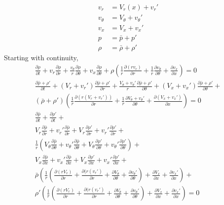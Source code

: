 \begin{align}
v_r 		&= V_r(x) + v_r'\\
v_{\theta} 	&= V_{\theta} + v_{\theta}'\\
v_x 		&= V_x + v_x'\\
p 			&= \bar{p} + p'\\
\rho 		&= \bar{\rho} + \rho'
\end{align}
\newpage
Starting with continuity,
\begin{equation*} 
\end{equation*}
\begin{align*}
\frac{\partial \rho}{\partial t} + 
v_r \frac{\partial \rho}{\partial r} +
\frac{v_{\theta}   }{r}
\frac{\partial \rho}{\partial \theta} +
v_x \frac{\partial \rho}{\partial \theta} + 
\rho 
\left(
\frac{1}{r} \frac{\partial (rv_r)	}{\partial r} +
\frac{1}{r}	\frac{\partial v_{\theta}}{\partial \theta} +
\frac{\partial v_x}{\partial x}
\right) 
= 0\\
\frac{\partial \bar{\rho} + \rho' }{\partial t} +
(V_r + v_r') 
\frac{\partial \bar{\rho} + \rho'}{\partial r} +
\frac{V_{\theta} + v_{\theta}'}{r}
\frac{\partial \bar{\rho} + \rho'}{\partial \theta} +
(V_x + v_x') 
\frac{\partial \bar{\rho} + \rho'}{\partial \theta} + \\ 
(\bar{\rho} + \rho') 
\left(
\frac{1}{r}\frac{\partial (r(V_r +v_r'))}{\partial r} +
\frac{1}{r}\frac{\partial V_{\theta}+v_{\theta}'}{\partial \theta} +
\frac{\partial (V_x + v_x')}{\partial x}
\right) = 0\\
\frac{\partial \bar{\rho}}{\partial t} + 
\frac{\partial \rho'     }{\partial t} +\\
V_r \frac{\partial \bar{\rho}}{\partial r} +  
v_r'\frac{\partial \bar{\rho}}{\partial r} + 
V_r \frac{\partial \rho'}{\partial r} +
v_r'\frac{\partial \rho'}{\partial r} + \\
\frac{1}{r}
\left(
V_{\theta} \frac{\partial \bar{\rho}}{\partial \theta} +
v_{\theta}'\frac{\partial \bar{\rho}}{\partial \theta} + 
V_{\theta} \frac{\partial \rho'		}{\partial \theta} + 
v_{\theta}'\frac{\partial \rho'		}{\partial \theta}
\right) + \\ 
V_x \frac{\partial \bar{\rho}}{\partial x} + 
v_x'\frac{\partial \bar{\rho}}{\partial x} +
V_x \frac{\partial \rho'	 }{\partial x} 	+
v_x'\frac{\partial \rho'    }{\partial x}		+\\
\bar{\rho} 
\left(
\frac{1}{r}
\left(
\frac{\partial (rV_r  )    }{\partial r} +
\frac{\partial (r(v_r')    }{\partial r} +
\frac{\partial V_{\theta}  }{\partial \theta} +
\frac{\partial v_{\theta}' }{\partial \theta}
\right) +
\frac{\partial V_x }{\partial x} +
\frac{\partial v_x'}{\partial x}
\right) + \\
\rho'
\left(
\frac{1}{r}
\left(
\frac{\partial (rV_r  )    }{\partial r} +
\frac{\partial (r(v_r')    }{\partial r} +
\frac{\partial V_{\theta}  }{\partial \theta} +
\frac{\partial v_{\theta}' }{\partial \theta}
\right) +
\frac{\partial V_x }{\partial x} +
\frac{\partial v_x'}{\partial x}
\right)
= 0	\\
\end{align*}
